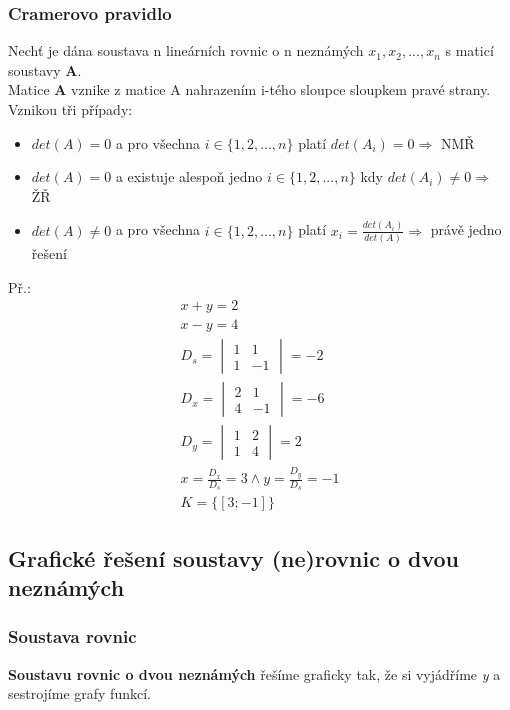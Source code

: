 \documentclass[12pt, a4paper]{article}
\newcommand{\imply}{\Rightarrow}
\begin{document}
\subsubsection*{Cramerovo pravidlo}
Nechť je dána soustava n lineárních rovnic o n neznámých $x_1, x_2, ..., x_n$ s maticí soustavy \textbf{A}.\\
Matice \textbf{A} vznike z matice A nahrazením i-tého sloupce sloupkem pravé strany. Vznikou tři případy:
\begin{itemize}
\item $det(A)=0$ a pro všechna $i \in \{1,2,...,n\}$ platí $det(A_i)=0 \imply$ NMŘ
\item $det(A)=0$ a existuje alespoň jedno $i \in \{1,2,...,n\}$ kdy $det(A_i) \neq 0 \imply$ ŽŘ
\item $det(A) \neq 0$ a pro všechna $i \in \{1,2,...,n\}$ platí $x_i = \frac{det(A_i)}{det(A)} \imply$ právě jedno řešení 
\end{itemize}
Př.:
\[
\begin{aligned}
x+y = 2 \\
x-y = 4 \\
D_s = \begin{vmatrix} 1 & 1 \\ 1 & -1 \end{vmatrix} = -2\\
D_x = \begin{vmatrix} 2 & 1 \\ 4 & -1 \end{vmatrix} = -6\\
D_y = \begin{vmatrix} 1 & 2 \\ 1 & 4 \end{vmatrix} = 2\\
x = \frac{D_x}{D_s} = 3 \land y = \frac{D_y}{D_s} = -1\\
K = \{[3;-1]\}
\end{aligned}
\]
\pagebreak
\subsection*{Grafické řešení soustavy (ne)rovnic o dvou neznámých}
\subsubsection*{Soustava rovnic}
\textbf{Soustavu rovnic o dvou neznámých} řešíme graficky tak, že si vyjádříme \textit{y} a sestrojíme grafy funkcí.\\
\end{document}
